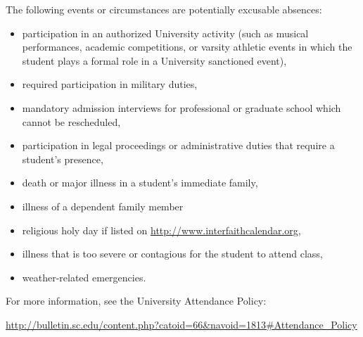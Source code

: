 \documentclass[10pt]{amsart}
\begin{document}
\noindent
The following events or circumstances are potentially excusable absences:
\begin{itemize}
\item
  participation in an authorized University activity (such as musical performances, academic competitions, or varsity athletic events in which the student plays a formal role in a University sanctioned event),
\item
  required participation in military duties,
\item
  mandatory admission interviews for professional or graduate school which cannot be rescheduled,
\item
  participation in legal proceedings or administrative duties that require a student's presence,
\item
  death or major illness in a student’s immediate family,
\item
  illness of a dependent family member
\item
  religious holy day if listed on \url{http://www.interfaithcalendar.org},
\item
  illness that is too severe or contagious for the student to attend class,
\item
  weather-related emergencies.
\end{itemize}
For more information, see the University Attendance Policy:
\begin{center}
  \url{http://bulletin.sc.edu/content.php?catoid=66&navoid=1813#Attendance_Policy}
\end{center}
\end{document}
